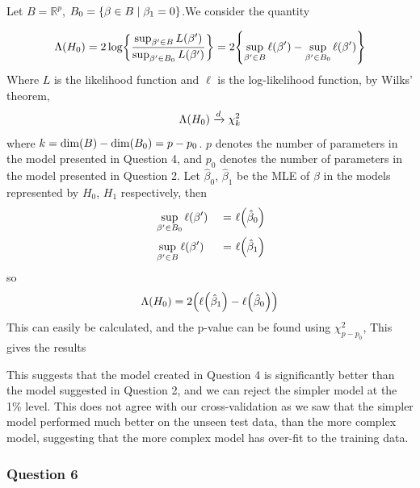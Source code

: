 \documentclass[11pt]{article} %
\let\originalleft\left
\let\originalright\right
\renewcommand{\left}{\mathopen{}\mathclose\bgroup\originalleft}
\renewcommand{\right}{\aftergroup\egroup\originalright}
\begin{document}
Let $B = \mathbb{R}^p$, $B_0 = \left\{\beta\in B \mid \beta_1 = 0\right\}$.We consider the quantity

\begin{equation*}
	\Lambda\left(H_0\right) = 2\log\left\{\frac{\sup_{\beta^\prime\in B}L\left(\beta^\prime\right)}{\sup_{\beta^\prime\in B_0}L\left(\beta^\prime\right)}\right\} = 2\left\{\sup_{\beta^\prime\in B}\ell\left(\beta^\prime\right) - \sup_{\beta^\prime\in B_0}\ell\left(\beta^\prime\right)\right\}
\end{equation*}
Where $L$ is the likelihood function and $\ell$ is the log-likelihood function, by Wilks' theorem, 
$$\Lambda\left(H_0\right) \xrightarrow{d} \chi^2_k$$
where $k = \dim\left(B\right) - \dim\left(B_0\right) = p - p_0$. $p$ denotes the number of parameters in the model presented in Question 4, and $p_0$ denotes the number of parameters in the model presented in Question 2. Let $\hat{\beta}_0$, $\hat{\beta}_1$ be the MLE of $\beta$ in the models represented by $H_0$, $H_1$ respectively, then
\begin{alignat*}{2}
	& \sup_{\beta^\prime\in B_0}\ell\left(\beta^\prime\right) &\ =\ & \ell\left(\hat{\beta}_0\right) \\
	& \sup_{\beta^\prime\in B}\ell\left(\beta^\prime\right) &\ =\ & \ell\left(\hat{\beta}_1\right)
\end{alignat*}
so
\begin{equation*}
	\Lambda\left(H_0\right) = 2\left(\ell\left(\hat{\beta}_1\right) - \ell\left(\hat{\beta}_0\right)\right)
\end{equation*}
This can easily be calculated, and the p-value can be found using $\chi^2_{p-p_0}$,
This gives the results


This suggests that the model created in Question 4 is significantly better than the model suggested in Question 2, and we can reject the simpler model at the 1\% level. This does not agree with our cross-validation as we saw that the simpler model performed much better on the unseen test data, than the more complex model, suggesting that the more complex model has over-fit to the training data.

\subsubsection*{Question 6}
\end{document}

